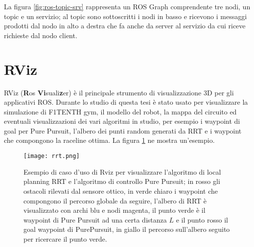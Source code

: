 La figura \ref{fig:ros-topic-srv} rappresenta un ROS Graph comprendente tre nodi, un topic e un servizio;
al topic sono sottoscritti i nodi in basso e ricevono i messaggi prodotti dal nodo in alto a destra che
fa anche da server al servizio da cui riceve richieste dal nodo client.

\section{RViz}
\label{sec:rviz}
RViz (\textbf{R}os \textbf{Vi}suali\textbf{z}er) è il principale strumento di visualizzazione 3D per gli
applicativi ROS. Durante lo studio di questa tesi è stato usato per visualizzare la simulazione di
F1TENTH gym, il modello del robot, la mappa del circuito ed eventuali visualizzazioni dei vari algoritmi
in studio, per esempio i waypoint di goal per Pure Pursuit, l'albero dei punti random generati da RRT e i
waypoint che compongono la raceline ottima. La figura \ref{fig:rviz-example} ne mostra un'esempio.

\begin{figure}[H]
	\centering
	\texttt{[image: rrt.png]}
	\caption{Esempio di caso d'uso di Rviz per visualizzare l'algoritmo di local planning RRT e
	l'algoritmo di controllo Pure Pursuit; in rosso gli ostacoli rilevati dal sensore ottico, in verde
	chiaro i waypoint che compongono il percorso globale da seguire, l'albero di RRT è visualizzato con
	archi blu e nodi magenta, il punto verde è il waypoint di Pure Pursuit ad una certa distanza $L$ e il
	punto rosso il goal waypoint di PurePursuit, in giallo il percorso sull'albero seguito per ricercare
	il punto verde.}
	\label{fig:rviz-example}
\end{figure}
